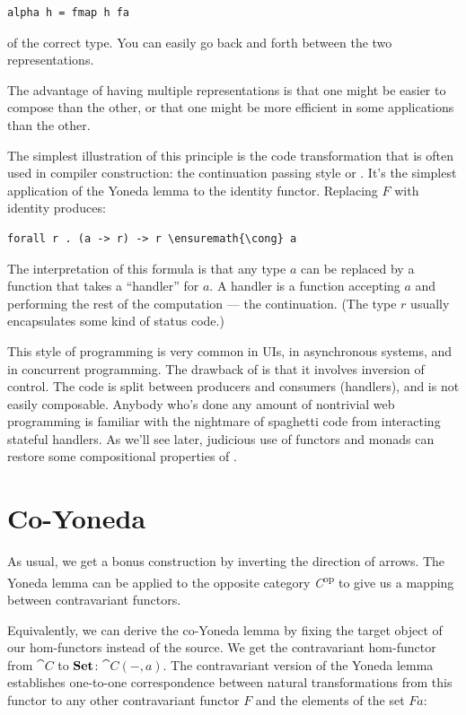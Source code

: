 \begin{Verbatim}
alpha h = fmap h fa
\end{Verbatim}
of the correct type. You can easily go back and forth between the two
representations.

The advantage of having multiple representations is that one might be
easier to compose than the other, or that one might be more efficient in
some applications than the other.

The simplest illustration of this principle is the code transformation
that is often used in compiler construction: the continuation passing
style or . It's the simplest application of the Yoneda lemma to the
identity functor. Replacing $F$ with identity produces:

\begin{Verbatim}
forall r . (a -> r) -> r \ensuremath{\cong} a
\end{Verbatim}
The interpretation of this formula is that any type $a$ can be
replaced by a function that takes a ``handler'' for $a$. A
handler is a function accepting $a$ and performing the rest of
the computation --- the continuation. (The type $r$ usually
encapsulates some kind of status code.)

This style of programming is very common in UIs, in asynchronous
systems, and in concurrent programming. The drawback of  is that it
involves inversion of control. The code is split between producers and
consumers (handlers), and is not easily composable. Anybody who's done
any amount of nontrivial web programming is familiar with the nightmare
of spaghetti code from interacting stateful handlers. As we'll see
later, judicious use of functors and monads can restore some
compositional properties of .

\section{Co-Yoneda}\label{co-yoneda}

As usual, we get a bonus construction by inverting the direction of
arrows. The Yoneda lemma can be applied to the opposite category
\emph{C}\textsuperscript{op} to give us a mapping between contravariant
functors.

Equivalently, we can derive the co-Yoneda lemma by fixing the target
object of our hom-functors instead of the source. We get the
contravariant hom-functor from $\cat{C}$ to $\mathbf{Set}$:
$\cat{C}(-, a)$. The contravariant version of the Yoneda lemma
establishes one-to-one correspondence between natural transformations
from this functor to any other contravariant functor $F$ and the
elements of the set $F a$:


